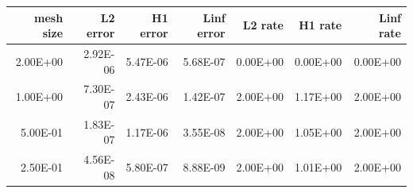 \begin{tabular}{rrrrrrr}
\toprule
mesh size & L2 error & H1 error & Linf error & L2 rate & H1 rate & Linf rate \\
\midrule
2.00E+00 & 2.92E-06 & 5.47E-06 & 5.68E-07 & 0.00E+00 & 0.00E+00 & 0.00E+00 \\
1.00E+00 & 7.30E-07 & 2.43E-06 & 1.42E-07 & 2.00E+00 & 1.17E+00 & 2.00E+00 \\
5.00E-01 & 1.83E-07 & 1.17E-06 & 3.55E-08 & 2.00E+00 & 1.05E+00 & 2.00E+00 \\
2.50E-01 & 4.56E-08 & 5.80E-07 & 8.88E-09 & 2.00E+00 & 1.01E+00 & 2.00E+00 \\
\bottomrule
\end{tabular}
